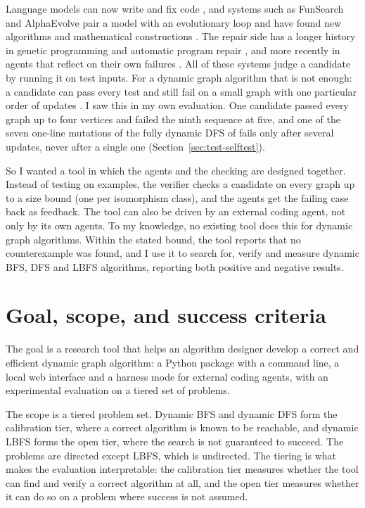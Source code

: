 Language models can now write and fix code \citep{chen2021codex,openai2025codex,
jimenez2024swebench}, and systems such as FunSearch and AlphaEvolve pair a model
with an evolutionary loop and have found new algorithms and mathematical
constructions \citep{funsearch2023,alphaevolve2025,alphatensor2022,lehman2023elm}.
The repair side has a longer history in genetic programming and automatic
program repair \citep{koza1992gp,legoues2012genprog}, and more recently in
agents that reflect on their own failures \citep{reflexion2023,
madaan2023selfrefine,yao2023react}. All of these systems judge a candidate by
running it on test inputs. For a dynamic graph algorithm that is not enough: a
candidate can pass every test and still fail on a small graph with one
particular order of updates \citep{claessen2000quickcheck,jia2011mutation}. I
saw this in my own evaluation. One candidate passed every graph up to four
vertices and failed the ninth sequence at five, and one of the seven one-line
mutations of the fully dynamic DFS of \citet{yang2019dynamic} fails only after
several updates, never after a single one (Section~\ref{sec:test-selftest}).

So I wanted a tool in which the agents and the checking are designed together.
Instead of testing on examples, the verifier checks a candidate on every graph
up to a size bound (one per isomorphism class), and the agents get the failing
case back as feedback. The tool can also be driven by an external coding agent,
not only by its own agents. To my knowledge, no existing tool does this for
dynamic graph algorithms. Within the stated bound, the tool reports that no
counterexample was found, and I use it to search for, verify and measure dynamic
BFS, DFS and LBFS algorithms, reporting both positive and negative results.

\section{Goal, scope, and success criteria}

The goal is a research tool that helps an algorithm designer develop a correct
and efficient dynamic graph algorithm: a Python package with a command line, a
local web interface and a harness mode for external coding agents, with an
experimental evaluation on a tiered set of problems.

The scope is a tiered problem set. Dynamic BFS and dynamic DFS form the
calibration tier, where a correct algorithm is known to be reachable, and
dynamic LBFS forms the open tier, where the search is not guaranteed to succeed.
The problems are directed except LBFS, which is undirected. The tiering is what
makes the evaluation interpretable: the calibration tier measures whether the
tool can find and verify a correct algorithm at all, and the open tier measures
whether it can do so on a problem where success is not assumed.

